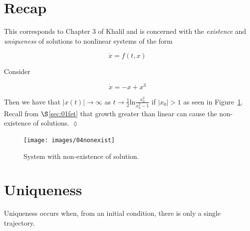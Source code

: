 \mainmatter%
\setcounter{page}{1}

\lectureseries[\course]{\course}

\date{January 14, 2010}

\setaddress%

\setcounter{lecture}{3}
\setcounter{chapter}{3}


\section{Recap}
This corresponds to Chapter 3 of Khalil and is concerned with the \textit{existence} and \textit{uniqueness} of solutions to nonlinear systems of the form

\begin{equation*}
\dot{x} = f(t,x)
\end{equation*}

\begin{example}
Consider

\begin{equation*}
\dot{x} = -x + x^3
\end{equation*}

Then we have that $|x(t)|\to\infty$ as $t\to\tfrac{1}{2}\text{ln}\frac{x_0^2}{x_0^2-1}$ if $|x_0|>1$ as seen in Figure~\ref{fig:04nonexist}.
Recall from $\S$\ref{sec:01fet} that growth greater than linear can cause the non-existence of solutions.
$\lozenge$
\end{example}

\begin{figure}[ht!]
\centering
\texttt{[image: images/04nonexist]}
\caption{System with non-existence of solution.}%
\label{fig:04nonexist}
\end{figure}

\section{Uniqueness}
Uniqueness occurs when, from an initial condition, there is only a single trajectory.

